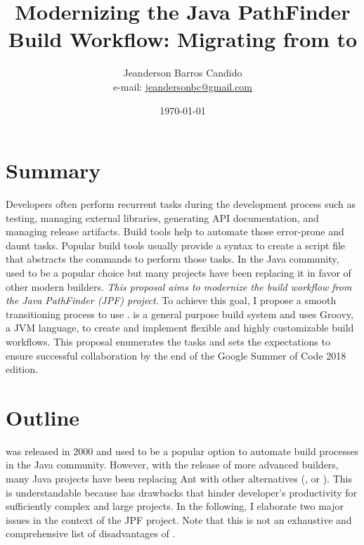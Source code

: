 \documentclass{article}
\author{Jeanderson Barros Candido\\e-mail: \url{jeandersonbc@gmail.com}}
\title{Modernizing the Java PathFinder Build Workflow: Migrating from \ant{} to
\gradle{}}
\date{\today}
\begin{document}
\maketitle

\section*{Summary}

\noindent
Developers often perform recurrent tasks during the development process such
as testing, managing external libraries, generating API documentation, and
managing release artifacts.
Build tools help to automate those error-prone and daunt tasks.
Popular build tools usually provide a syntax to create a script file that
abstracts the commands to perform those tasks.
In the Java community, \ant{} used to be a popular choice but many
projects have been replacing it in favor of other modern builders.
\emph{This proposal aims to modernize the build workflow from the Java
PathFinder (JPF) project}.
To achieve this goal, I propose a smooth transitioning process to use
\gradle{}.
\gradle{} is a general purpose build system and uses Groovy, a JVM language, to
create and implement flexible and highly customizable build workflows.
This proposal enumerates the tasks and sets the expectations to ensure
successful collaboration by the end of the Google Summer of Code 2018 edition.

\section{Outline}
\label{sec:intro}

\ant{}\cite{page:ant} was released in 2000 and used to be a popular option to
automate build processes in the Java community.
However, with the release of more advanced builders, many Java projects have
been replacing Ant with other alternatives (\eg, \gradle{}\cite{page:gradle} or
\maven{}\cite{page:maven}).
This is understandable because \ant{} has drawbacks that hinder developer's
productivity for sufficiently complex and large projects.
In the following, I elaborate two major issues in the context of the JPF
project.
Note that this is not an exhaustive and comprehensive list of disadvantages of
\ant{}.
\end{document}
